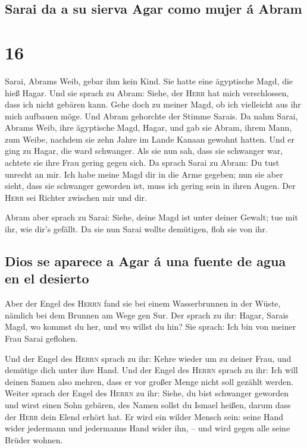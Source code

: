 \hypertarget{sarai-da-a-su-sierva-agar-como-mujer-uxe1-abram}{%
\subsection{Sarai da a su sierva Agar como mujer á
Abram}\label{sarai-da-a-su-sierva-agar-como-mujer-uxe1-abram}}

\hypertarget{section-15}{%
\section{16}\label{section-15}}

 Sarai, Abrams Weib, gebar ihm kein Kind. Sie hatte eine
ägyptische Magd, die hieß Hagar.  Und sie sprach zu Abram:
Siehe, der \textsc{Herr} hat mich verschlossen, dass ich nicht gebären
kann. Gehe doch zu meiner Magd, ob ich vielleicht aus ihr mich aufbauen
möge. Und Abram gehorchte der Stimme Sarais.  Da nahm
Sarai, Abrams Weib, ihre ägyptische Magd, Hagar, und gab sie Abram,
ihrem Mann, zum Weibe, nachdem sie zehn Jahre im Lande Kanaan gewohnt
hatten.  Und er ging zu Hagar, die ward schwanger. Als sie
nun sah, dass sie schwanger war, achtete sie ihre Frau gering gegen
sich.  Da sprach Sarai zu Abram: Du tust unrecht an mir.
Ich habe meine Magd dir in die Arme gegeben; nun sie aber sieht, dass
sie schwanger geworden ist, muss ich gering sein in ihren Augen. Der
\textsc{Herr} sei Richter zwischen mir und dir.

 Abram aber sprach zu Sarai: Siehe, deine Magd ist unter
deiner Gewalt; tue mit ihr, wie dir's gefällt. Da sie nun Sarai wollte
demütigen, floh sie von ihr.

\hypertarget{dios-se-aparece-a-agar-uxe1-una-fuente-de-agua-en-el-desierto}{%
\subsection{Dios se aparece a Agar á una fuente de agua en el
desierto}\label{dios-se-aparece-a-agar-uxe1-una-fuente-de-agua-en-el-desierto}}

 Aber der Engel des \textsc{Herrn} fand sie bei einem
Wasserbrunnen in der Wüste, nämlich bei dem Brunnen am Wege gen Sur.
 Der sprach zu ihr: Hagar, Sarais Magd, wo kommst du her,
und wo willst du hin? Sie sprach: Ich bin von meiner Frau Sarai
geflohen.

 Und der Engel des \textsc{Herrn} sprach zu ihr: Kehre
wieder um zu deiner Frau, und demütige dich unter ihre Hand.
 Und der Engel des \textsc{Herrn} sprach zu ihr: Ich will
deinen Samen also mehren, dass er vor großer Menge nicht soll gezählt
werden.  Weiter sprach der Engel des \textsc{Herrn} zu
ihr: Siehe, du bist schwanger geworden und wirst einen Sohn gebären, des
Namen sollst du Ismael heißen, darum dass der \textsc{Herr} dein Elend
erhört hat.  Er wird ein wilder Mensch sein: seine Hand
wider jedermann und jedermanns Hand wider ihn, -- und wird gegen alle
seine Brüder wohnen.


